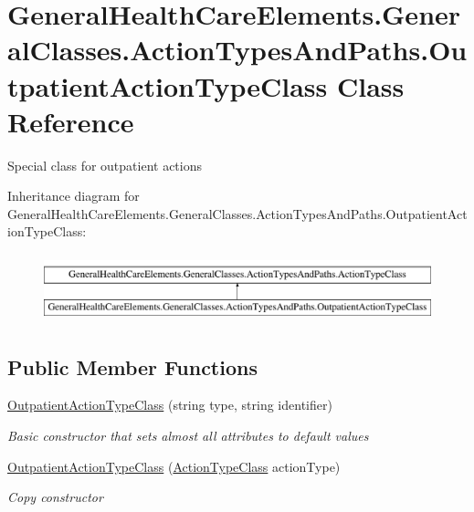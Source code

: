\hypertarget{class_general_health_care_elements_1_1_general_classes_1_1_action_types_and_paths_1_1_outpatient_action_type_class}{}\section{General\+Health\+Care\+Elements.\+General\+Classes.\+Action\+Types\+And\+Paths.\+Outpatient\+Action\+Type\+Class Class Reference}
\label{class_general_health_care_elements_1_1_general_classes_1_1_action_types_and_paths_1_1_outpatient_action_type_class}


Special class for outpatient actions  


Inheritance diagram for General\+Health\+Care\+Elements.\+General\+Classes.\+Action\+Types\+And\+Paths.\+Outpatient\+Action\+Type\+Class\+:\begin{figure}[H]
\begin{center}
\leavevmode
\includegraphics[height=2.000000cm]{class_general_health_care_elements_1_1_general_classes_1_1_action_types_and_paths_1_1_outpatient_action_type_class}
\end{center}
\end{figure}
\subsection*{Public Member Functions}
\begin{DoxyCompactItemize}
\item 
\hyperlink{class_general_health_care_elements_1_1_general_classes_1_1_action_types_and_paths_1_1_outpatient_action_type_class_ab2c2d782f1d7923e1e39b78d9a7385a1}{Outpatient\+Action\+Type\+Class} (string type, string identifier)
\begin{DoxyCompactList}\small\item\em Basic constructor that sets almost all attributes to default values \end{DoxyCompactList}\item 
\hyperlink{class_general_health_care_elements_1_1_general_classes_1_1_action_types_and_paths_1_1_outpatient_action_type_class_ad39288767c4bb5ee9981a74a03a5e058}{Outpatient\+Action\+Type\+Class} (\hyperlink{class_general_health_care_elements_1_1_general_classes_1_1_action_types_and_paths_1_1_action_type_class}{Action\+Type\+Class} action\+Type)
\begin{DoxyCompactList}\small\item\em Copy constructor \end{DoxyCompactList}\end{DoxyCompactItemize}
